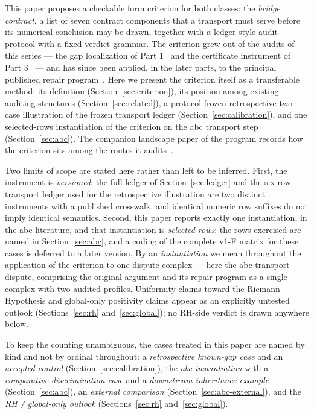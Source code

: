 \documentclass[11pt,a4paper]{article}
\begin{document}
This paper proposes a checkable form criterion for both classes: the
\emph{bridge contract}, a list of seven contract components that a
transport must serve before its numerical conclusion may be drawn, together
with a ledger-style audit protocol with a fixed verdict grammar. The
criterion grew out of the audits of this series --- the gap localization of
Part 1~\cite{part1} and the certificate instrument of Part 3~\cite{part3}
--- and has since been applied, in the later parts, to the principal
published repair program~\cite{part4,part5,part6}. Here we present the
criterion itself as a transferable method: its definition
(Section~\ref{sec:criterion}), its position among existing auditing
structures (Section~\ref{sec:related}), a protocol-frozen retrospective
two-case illustration of the frozen transport ledger
(Section~\ref{sec:calibration}), and one selected-rows instantiation of the
criterion on the abc transport step (Section~\ref{sec:abc}). The
companion landscape paper of the program records how the criterion sits
among the routes it audits~\cite{landscapeA}.

Two limits of scope are stated here rather than left to be inferred. First,
the instrument is \emph{versioned}: the full ledger of
Section~\ref{sec:ledger} and the six-row transport ledger used for the
retrospective illustration are two distinct instruments with a published
crosswalk, and identical numeric row suffixes do not imply identical
semantics. Second, this paper reports exactly one instantiation, in the abc
literature, and that instantiation is \emph{selected-rows}: the rows
exercised are named in Section~\ref{sec:abc}, and a coding of the complete
v1-F matrix for these cases is deferred to a later version. By an
\emph{instantiation} we mean throughout the application of the criterion to
one dispute complex --- here the abc transport dispute, comprising the
original argument and its repair program as a single complex with two
audited profiles. Uniformity claims toward the Riemann
Hypothesis and global-only positivity claims appear as an explicitly
untested outlook (Sections~\ref{sec:rh} and~\ref{sec:global}); no RH-side
verdict is drawn anywhere below.

To keep the counting unambiguous, the cases treated in this paper are named
by kind and not by ordinal throughout: a \emph{retrospective known-gap
case} and an \emph{accepted control} (Section~\ref{sec:calibration}), the
\emph{abc instantiation} with a \emph{comparative discrimination case} and
a \emph{downstream inheritance example} (Section~\ref{sec:abc}), an
\emph{external comparison} (Section~\ref{sec:abc-external}), and the
\emph{RH / global-only outlook} (Sections~\ref{sec:rh} and~\ref{sec:global}).
\end{document}
